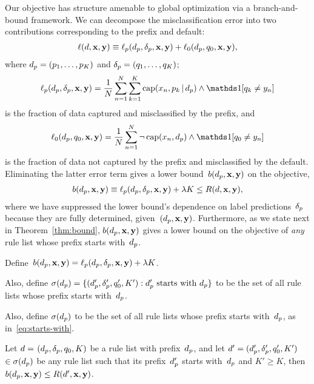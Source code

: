 Our objective has structure amenable to global optimization via a branch-and-bound framework.
%
We can decompose the misclassification error into two contributions
corresponding to the prefix and default:
\begin{align}
\Loss(\RL, \x, \y) %
\equiv \Loss_p(\Prefix, \Labels, \x, \y) + \Loss_0(\Prefix, \Default, \x, \y),
\end{align}
where ${d_p = (p_1, \dots, p_K)}$ and ${\delta_p = (q_1, \dots, q_K)}$;
\begin{align}
\Loss_p(\Prefix, \Labels, \x, \y) =
\frac{1}{N} \sum_{n=1}^N \sum_{k=1}^K \Cap(x_n, p_k \given \Prefix) \wedge \one [ q_k \neq y_n ]
\label{eq:loss}
\end{align}
is the fraction of data captured and misclassified by the prefix, and
\begin{align}
\Loss_0(\Prefix, \Default, \x, \y) =
\frac{1}{N} \sum_{n=1}^N \neg\, \Cap(x_n, \Prefix) \wedge \one [ \Default \neq y_n ]
\end{align}
is the fraction of data not captured by the prefix and misclassified by the default.
%
Eliminating the latter error term gives a lower bound~$b(d_p, \mathbf{x}, \mathbf{y})$ on the objective,
\begin{align}
b(\Prefix, \x, \y) \equiv \Loss_p(\Prefix, \Labels, \x, \y) + \Reg K \le \Obj(\RL, \x, \y),
\label{eq:lower-bound}
\end{align}
where we have suppressed the lower bound's dependence on label predictions~$\delta_p$
because they are fully determined, given~${(d_p, \mathbf{x}, \mathbf{y})}$.
%
Furthermore, as we state next in Theorem~\ref{thm:bound},
$b(d_p, \mathbf{x}, \mathbf{y})$ gives a lower bound on the objective of
\emph{any} rule list whose prefix starts with~$d_p$.

\begin{theorem}
Define~${b(d_p, \mathbf{x}, \mathbf{y}) = \ell_p(d_p, \delta_p, \mathbf{x}, \mathbf{y}) + {\lambda} K}$.
%
\begin{arxiv}
Also, define
${\sigma(d_p) = \{(d_p', \delta_p', q_0', K') : d_p' \textnormal{ starts with } d_p \}}$
to be the set of all rule lists whose prefix starts with~$d_p$.
\end{arxiv}
\begin{kdd}
Also, define $\sigma(d_p)$
to be the set of all rule lists whose prefix starts with~$d_p$,
as in~\eqref{eq:starts-with}.
\end{kdd}
%
Let ${{d} = }$ ${(d_p, \delta_p, q_0, K)}$ be a rule list
with prefix~$d_p$, and let
${{d}' = (d_p', \delta_p', q_0', K')}$ $\in \sigma(d_p)$
be any rule list such that its prefix~$d_p'$ starts with~$d_p$
and ${K' \ge K}$, then ${b(d_p, \mathbf{x}, \mathbf{y}) \le R({d}', \mathbf{x}, \mathbf{y})}$.
\label{thm:bound}
\end{theorem}

